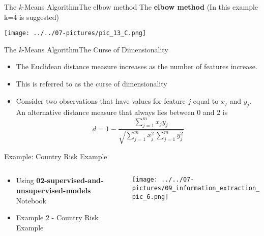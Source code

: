 \documentclass[11pt]{beamer}
\begin{document}
\begin{frame}{The \textit{k}-Means Algorithm}{The elbow method}
	The \textbf{elbow method} (In this example k=4 is suggested)
	\begin{center}
	\texttt{[image: ../../07-pictures/pic\_13\_C.png]}
	\end{center}
\end{frame}
\begin{frame}{The \textit{k}-Means Algorithm}{The Curse of Dimensionality}
	\begin{itemize}
		\item The Euclidean distance measure increases as the number of features increase.
		\item This is referred to as the curse of dimensionality
		\item Consider two observations that have values for feature $j$ equal to $x_j$ and $y_j$.  An alternative distance measure that always lies between $0$ and $2$ is
		\begin{equation}
		d=1 - \frac{\sum\limits_{j=1}^m x_j y_j}{\sqrt{\sum\limits_{j=1}^m x_j^2 \, \sum\limits_{j=1}^m y_j^2}}
		\end{equation}
	\end{itemize}
\end{frame}
%
%
\begin{frame}{Example: Country Risk Example}
\begin{columns}[T] %
\begin{column}{.48\textwidth}
        \begin{itemize}
		\item Using \textbf{02-supervised-and-unsupervised-models} Notebook 
		\item Example 2 - Country Risk Example
        \end{itemize}
\end{column}%
\hfill%
\begin{column}{.48\textwidth}
        \texttt{[image: ../../07-pictures/09\_information\_extraction\_pic\_6.png]}
\end{column}%
\end{columns}
\end{frame}
\end{document}
